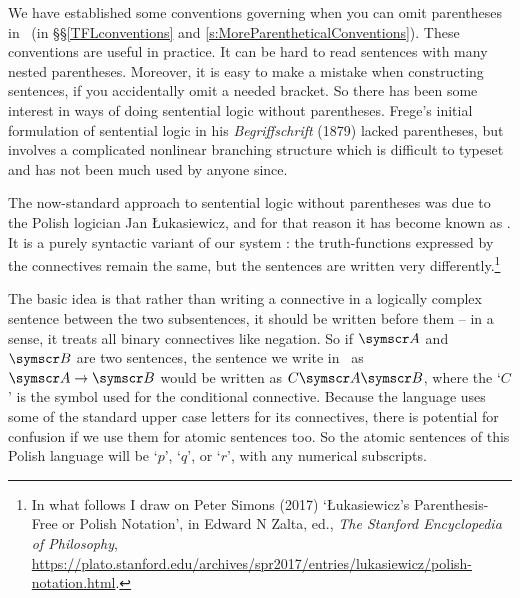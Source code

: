 We have established some conventions governing when you can omit parentheses in \TFL\ (in §§\ref{TFLconventions} and \ref{s:MoreParentheticalConventions}). These conventions are useful in practice. It can be hard to read sentences with many nested parentheses. Moreover, it is easy to make a mistake when constructing sentences, if you accidentally omit a needed bracket. So there has been some interest in ways of doing sentential logic without parentheses. Frege's initial formulation of sentential logic in his \emph{Begriffschrift} (1879) lacked parentheses, but involves a complicated nonlinear branching structure which is difficult to typeset and has not been much used by anyone since.

The now-standard approach to sentential logic without parentheses was due to the Polish logician Jan Łukasiewicz, and for that reason it has become known as . It is a purely syntactic variant of our system \TFL: the truth-functions expressed by the connectives remain the same, but the sentences are written very differently.\footnote{In what follows I draw on Peter Simons (2017) `Łukasiewicz's Parenthesis-Free or Polish Notation', in Edward N Zalta, ed., \emph{The Stanford Encyclopedia of Philosophy}, \url{https://plato.stanford.edu/archives/spr2017/entries/lukasiewicz/polish-notation.html}.}

The basic idea is that rather than writing a connective in a logically complex sentence between the two subsentences, it should be written before them – in a sense, it treats all binary connectives like negation. So if $\meta{A}$ and $\meta{B}$ are two sentences, the sentence we write in \TFL\ as $\meta{A} \eif \meta{B}$ would be written as $C\meta{A}\meta{B}$, where the `$C$' is the symbol used for the conditional connective. Because the language uses some of the standard upper case letters for its connectives, there is potential for confusion if we use them for atomic sentences too. So the atomic sentences of this Polish language will be `$p$', `$q$', or `$r$', with any numerical subscripts. 


